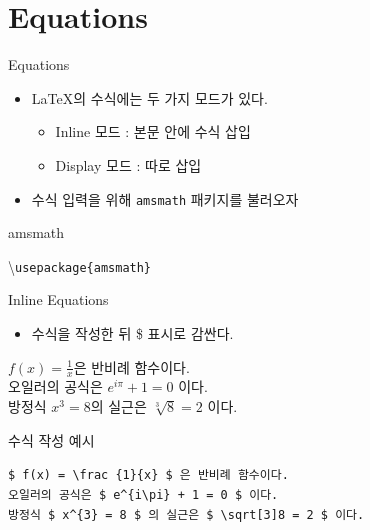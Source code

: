 \documentclass[12pt]{gshs_lecture}
\newcommand{\tb}{\textbackslash}
\newenvironment{codeblock}[1]{
	\begin{block}{#1}
		\setstretch{1.0}
		\begin{small}
}{
		\end{small}
	\end{block}
}
\begin{document}
\section{Equations}

\begin{frame}[t]{Equations}
	\begin{itemize}
		\item \LaTeX 의 수식에는 두 가지 모드가 있다.
		\begin{itemize}
			\item Inline 모드 : 본문 안에 수식 삽입
			\item Display 모드 : 따로 삽입
		\end{itemize}
	\end{itemize}

	\begin{itemize}
		\item 수식 입력을 위해 \texttt{amsmath} 패키지를 불러오자
	\end{itemize}
	
	\begin{codeblock}{amsmath}
		\tb\texttt{usepackage\{amsmath\}}
	\end{codeblock}
\end{frame}

\begin{frame}[t]{Inline Equations}
	
	\begin{itemize}
		\item 수식을 작성한 뒤 \$ 표시로 감싼다.
	\end{itemize}
	
	\begin{center}
	$ f(x) = \frac{1}{x} $은 반비례 함수이다. \\
	오일러의 공식은 $ e^{i\pi} + 1 = 0 $ 이다. \\
	방정식 $x^{3} = 8$의 실근은 $\sqrt[3]{8} = 2 $ 이다.
	\end{center}

	\begin{codeblock}{수식 작성 예시}
		\texttt{\$ f(x) = \tb frac \{1\}\{x\} \$ 은 반비례 함수이다. } \\
		\texttt{오일러의 공식은 \$ e\^{}\{i\tb pi\} + 1 = 0 \$ 이다. } \\
		\texttt{방정식 \$ x\^{}\{3\} = 8 \$ 의 실근은 \$ \tb sqrt[3]{8} = 2 \$ 이다. } \\
	\end{codeblock}
\end{frame}
\end{document}
